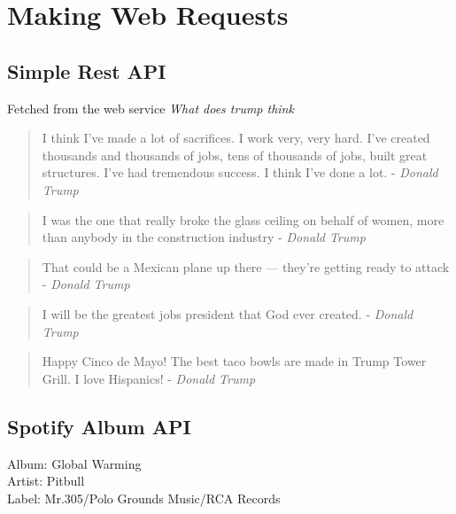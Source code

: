 \documentclass{article}
\begin{document}
  

  \section{Making Web Requests}
  \label{sec:Making Web Requests}

    \subsection{Simple Rest API}
    \label{sub:Simple Rest API}
      Fetched from the web service \textit{What does trump think}\\
                    \begin{quote}
          I think I've made a lot of sacrifices. I work very, very hard. I've created thousands and thousands of jobs, tens of thousands of jobs, built great structures. I've had tremendous success. I think I've done a lot. - \textit{Donald Trump}
        \end{quote}
                    \begin{quote}
          I was the one that really broke the glass ceiling on behalf of women, more than anybody in the construction industry - \textit{Donald Trump}
        \end{quote}
                    \begin{quote}
          That could be a Mexican plane up there — they're getting ready to attack - \textit{Donald Trump}
        \end{quote}
                    \begin{quote}
          I will be the greatest jobs president that God ever created. - \textit{Donald Trump}
        \end{quote}
                    \begin{quote}
          Happy Cinco de Mayo! The best taco bowls are made in Trump Tower Grill. I love Hispanics! - \textit{Donald Trump}
        \end{quote}
      

    \subsection{Spotify Album API}
    \label{sub:Spotify Album API}
        Album: Global Warming \\
    Artist: Pitbull \\
    Label: Mr.305/Polo Grounds Music/RCA Records \\
\end{document}
